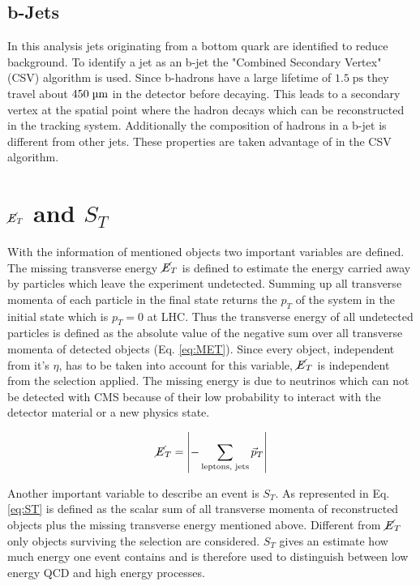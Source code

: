\subsection{b-Jets}
\label{sec:btag}
	In this analysis jets originating from a bottom quark are identified to reduce background. To identify a jet as an b-jet the "Combined Secondary Vertex" (CSV) algorithm is used. Since b-hadrons have a large lifetime of $1.5\;\text{ps}$ they travel about $450\;\text{\textmu m}$ in the detector before decaying. This leads to a secondary vertex at the spatial point where the hadron decays which can be reconstructed in the tracking system. Additionally the composition of hadrons in a b-jet is different from other jets.
	These properties are taken advantage of in the CSV algorithm. 
	
\section{$\cancel{E}_T$ and $S_T$}
	With the information of mentioned objects two important variables are defined. The missing transverse energy $\cancel{E}_T$ is defined to estimate the energy carried away by particles which leave the experiment undetected. Summing up all transverse momenta of each particle in the final state returns the $p_T$ of the system in the initial state which is $p_T = 0$ at LHC. Thus the transverse energy of all undetected particles is defined as the absolute value of the negative sum over all transverse momenta of detected objects (Eq. \ref{eq:MET}). Since every object, independent from it's $\eta$, has to be taken into account for this variable, $\cancel{E}_T$ is independent from the selection applied. The missing energy is due to neutrinos which can not be detected with CMS because of their low probability to interact with the detector material or a new physics state. 
	
	\begin{equation}
		\cancel{E}_T = \left| - \sum_{\textrm{leptons, jets}}^{} \vec{p}_T \right|
		\label{eq:MET}
	\end{equation}
	
	\noindent Another important variable to describe an event is $S_T$. As represented in Eq. \ref{eq:ST} is defined as the scalar sum of all transverse momenta of reconstructed objects plus the missing transverse energy mentioned above. Different from $\cancel{E}_T$ only objects surviving the selection are considered. $S_T$ gives an estimate how much energy one event contains and is therefore used to distinguish between low energy QCD and high energy processes. 
	
